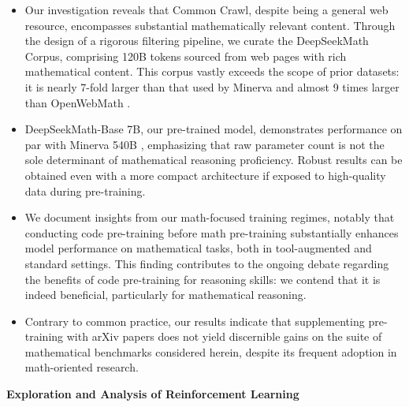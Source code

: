 \begin{itemize}[topsep=0pt]
    \item Our investigation reveals that Common Crawl, despite being a general web resource, encompasses substantial mathematically relevant content. Through the design of a rigorous filtering pipeline, we curate the DeepSeekMath Corpus, comprising 120B tokens sourced from web pages with rich mathematical content. This corpus vastly exceeds the scope of prior datasets: it is nearly 7-fold larger than that used by Minerva \citep{minerva} and almost 9 times larger than OpenWebMath \citep{openwebmath}.

    \item DeepSeekMath-Base 7B, our pre-trained model, demonstrates performance on par with Minerva 540B \citep{minerva}, emphasizing that raw parameter count is not the sole determinant of mathematical reasoning proficiency. Robust results can be obtained even with a more compact architecture if exposed to high-quality data during pre-training.

    \item We document insights from our math-focused training regimes, notably that conducting code pre-training before math pre-training substantially enhances model performance on mathematical tasks, both in tool-augmented and standard settings. This finding contributes to the ongoing debate regarding the benefits of code pre-training for reasoning skills: we contend that it is indeed beneficial, particularly for mathematical reasoning.

    \item Contrary to common practice, our results indicate that supplementing pre-training with arXiv papers does not yield discernible gains on the suite of mathematical benchmarks considered herein, despite its frequent adoption in math-oriented research.
\end{itemize}

\textbf{Exploration and Analysis of Reinforcement Learning}

